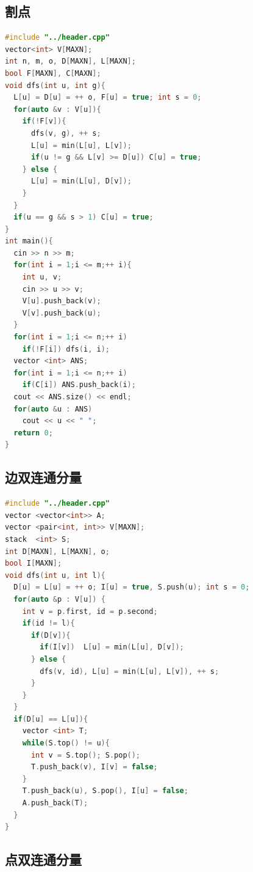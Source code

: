 \documentclass[10pt]{ctexart}
\begin{document}
\begin{multicols}{3}
    \subsection{割点}\label{ux5272ux70b9}

\begin{lstlisting}[language={C++}]
#include "../header.cpp"
vector<int> V[MAXN];
int n, m, o, D[MAXN], L[MAXN];
bool F[MAXN], C[MAXN];
void dfs(int u, int g){
  L[u] = D[u] = ++ o, F[u] = true; int s = 0;
  for(auto &v : V[u]){
    if(!F[v]){
      dfs(v, g), ++ s;
      L[u] = min(L[u], L[v]);
      if(u != g && L[v] >= D[u]) C[u] = true;
    } else {
      L[u] = min(L[u], D[v]);
    }
  }
  if(u == g && s > 1) C[u] = true;
}
int main(){
  cin >> n >> m;
  for(int i = 1;i <= m;++ i){
    int u, v;
    cin >> u >> v;
    V[u].push_back(v);
    V[v].push_back(u);
  }
  for(int i = 1;i <= n;++ i)
    if(!F[i]) dfs(i, i);
  vector <int> ANS;
  for(int i = 1;i <= n;++ i)
    if(C[i]) ANS.push_back(i);
  cout << ANS.size() << endl;
  for(auto &u : ANS)
    cout << u << " ";
  return 0;
}
\end{lstlisting}

    \subsection{边双连通分量}\label{ux8fb9ux53ccux8fdeux901aux5206ux91cf}

\begin{lstlisting}[language={C++}]
#include "../header.cpp"
vector <vector<int>> A;
vector <pair<int, int>> V[MAXN];
stack  <int> S;
int D[MAXN], L[MAXN], o;
bool I[MAXN];
void dfs(int u, int l){
  D[u] = L[u] = ++ o; I[u] = true, S.push(u); int s = 0;
  for(auto &p : V[u]) {
    int v = p.first, id = p.second;
    if(id != l){
      if(D[v]){
        if(I[v])  L[u] = min(L[u], D[v]);
      } else {
        dfs(v, id), L[u] = min(L[u], L[v]), ++ s;
      }
    }
  }
  if(D[u] == L[u]){
    vector <int> T;
    while(S.top() != u){
      int v = S.top(); S.pop();
      T.push_back(v), I[v] = false;
    }
    T.push_back(u), S.pop(), I[u] = false;
    A.push_back(T);
  }
}
\end{lstlisting}

    \subsection{点双连通分量}\label{ux70b9ux53ccux8fdeux901aux5206ux91cf}


\end{multicols}
\end{document}
